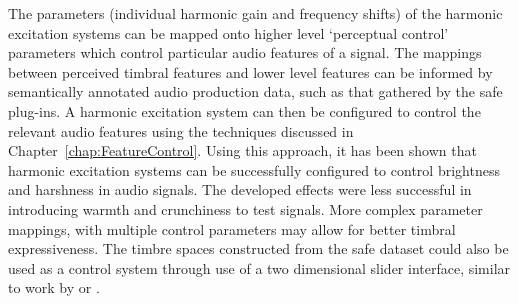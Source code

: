 	The parameters (individual harmonic gain and frequency shifts) of the harmonic excitation systems can be mapped
	onto higher level `perceptual control' parameters which control particular audio features of a signal. The mappings
	between perceived timbral features and lower level features can be informed by semantically annotated audio
	production data, such as that gathered by the \acrshort{safe} plug-ins. A harmonic excitation system can then be
	configured to control the relevant audio features using the techniques discussed in
	Chapter~\ref{chap:FeatureControl}. Using this approach, it has been shown that harmonic excitation systems can be
	successfully configured to control brightness and harshness in audio signals. The developed effects were less
	successful in introducing warmth and crunchiness to test signals. More complex parameter mappings, with multiple
	control parameters may allow for better timbral expressiveness. The timbre spaces constructed from the
	\acrshort{safe} dataset could also be used as a control system through use of a two dimensional slider interface,
	similar to work by \citet{schwarz2007corpus} or \citet{stasis2015a}.
